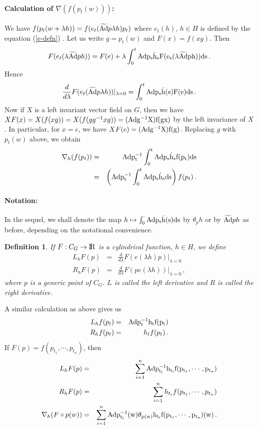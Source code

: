 \documentclass[12pt,a4paper]{book}
\newtheorem{definition}[theorem]{Definition}
\newcommand{\Ad}{\rm {Ad}}
\newcommand{\tA}{\widetilde{\Ad}}
\newcommand{\R}{{\rm I\!R}}
\newcommand{\ra}{ \rightarrow }
\begin{document}
\paragraph{Calculation of $\nabla (f(p_t(w)))$:}
We have $f(p_t(w+\lambda h))=f(e_t(\tA p \lambda h)p_t)$ where
$e_t(h), \,h\in H$ is defined by the equation (\ref{e-defn}) . Let us write
$g=p_t(w)$ and $F(x)=f(xg)$. Then
$$
F(e_t(\lambda\tA ph))=F(e)+\lambda\int_0^t \Ad p_s\dot{h}_s
F(e_s(\lambda\tA ph)) ds\,.
$$
Hence
$$
\frac{d}{d\lambda}F(e_t(\tA p \lambda h))|_{\lambda=0}=
       \int_0^t \Ad p_s\dot{h}(s)F(e)ds\,.
$$
Now if $X$ is a left invariant vector field on $G$, then we have
$XF(x)=X(f(xg))=X(f(gg^{-1}xg))=(\Ad g^{-1}X)f(gx)$ by the left invariance
of $X$. In particular, for $x=e$, we have $XF(e)=(\Ad g^{-1}X)f(g)$. Replacing
$g$ with $p_t(w)$ above, we obtain
\begin{eqnarray}
\nabla_h(f(p_t))&=&\Ad p_t^{-1}\int_0^t\Ad p_s \dot{h}_s f(p_t)ds\\
    &=&\left( \Ad p_t^{-1}\int_0^t\Ad p_s \dot{h}_s ds\right) f(p_t)\,.
\end{eqnarray}
\paragraph{Notation:} In the sequel, we shall denote the map
$h\mapsto \int_0^{\cdot}\Ad p_s\dot{h}(s)ds $ by $\theta_p h$ or
by $\tA ph$ as before, depending on the notational convenience.
\begin{definition}
If $F:C_G\ra \R$ is a cylindrical function, $h\in H$, we define
\begin{eqnarray}
L_hF(p)&=&\frac{d}{d\lambda}F(e(\lambda h)p)|_{\lambda=0}\\
R_hF(p)&=&\frac{d}{d\lambda}F(p e(\lambda h))|_{\lambda=0}\,,
\end{eqnarray}
where $p$ is a generic point of $C_G$. $L$ is called the left derivative and
$R$ is called the right derivative.
\end{definition}

A similar calculation as above gives us
\begin{eqnarray}
L_hf(p_t)&=&\Ad p_t^{-1}h_t f(p_t)\\
R_hf(p_t)&=&h_tf(p_t)\,.
\end{eqnarray}
If $F(p)=f(p_{t_1},\cdots,p_{t_n})$, then
\begin{eqnarray}
L_hF(p)&=&\sum_{i=1}^n \Ad p_{t_i}^{-1}h_{t_i}f(p_{t_1},\cdots,p_{t_n})\\
R_hF(p)&=&\sum_{i=1}^nh_{t_i}f(p_{t_1},\cdots,p_{t_n})\\
\nabla_h(F\circ p(w))&=&\sum_{i=1}^n
      \Ad p_{t_i}^{-1}(w) \theta_{p(w)}h_{t_i}f(p_{t_1},\cdots,p_{t_n})(w)\,.
\end{eqnarray}
\end{document}

